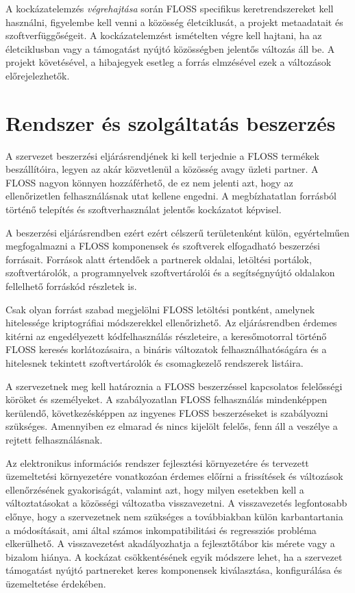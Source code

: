 \documentclass[12pt,magyar,a4paper,oneside]{scrreprt}
\begin{document}
A kockázatelemzés \emph{végrehajtása} során FLOSS specifikus
keretrendszereket kell használni, figyelembe kell venni a közösség
életciklusát, a projekt metaadatait és szoftverfüggőségeit. A
kockázatelemzést ismételten végre kell hajtani, ha az életciklusban vagy
a támogatást nyújtó közösségben jelentős változás áll be. A projekt
követésével, a hibajegyek esetleg a forrás elmzésével ezek a változások
előrejelezhetők.

\hypertarget{rendszer-uxe9s-szolguxe1ltatuxe1s-beszerzuxe9s}{%
\section{Rendszer és szolgáltatás
beszerzés}\label{rendszer-uxe9s-szolguxe1ltatuxe1s-beszerzuxe9s}}

A szervezet beszerzési eljárásrendjének ki kell terjednie a FLOSS
termékek beszállítóira, legyen az akár közvetlenül a közösség avagy
üzleti partner. A FLOSS nagyon könnyen hozzáférhető, de ez nem jelenti
azt, hogy az ellenőrizetlen felhasználásnak utat kellene engedni. A
megbízhatatlan forrásból történő telepítés és szoftverhasználat jelentős
kockázatot képvisel.

A beszerzési eljárásrendben ezért ezért célszerű területenként külön,
egyértelműen megfogalmazni a FLOSS komponensek és szoftverek elfogadható
beszerzési forrásait. Források alatt értendőek a partnerek oldalai,
letöltési portálok, szoftvertárolók, a programnyelvek szoftvertárolói és
a segítségnyújtó oldalakon fellelhető forráskód részletek is.

Csak olyan forrást szabad megjelölni FLOSS letöltési pontként, amelynek
hitelessége kriptográfiai módszerekkel ellenőrizhető. Az eljárásrendben
érdemes kitérni az engedélyezett kódfelhasználás részleteire, a
keresőmotorral történő FLOSS keresés korlátozásaira, a bináris
változatok felhasználhatóságára és a hitelesnek tekintett
szoftvertárolók és csomagkezelő rendszerek listáira.

A szervezetnek meg kell határoznia a FLOSS beszerzéssel kapcsolatos
felelősségi köröket és személyeket. A szabályozatlan FLOSS felhasználás
mindenképpen kerülendő, következésképpen az ingyenes FLOSS beszerzéseket
is szabályozni szükséges. Amennyiben ez elmarad és nincs kijelölt
felelős, fenn áll a veszélye a rejtett felhasználásnak.

Az elektronikus információs rendszer fejlesztési környezetére és
tervezett üzemeltetési környezetére vonatkozóan érdemes előírni a
frissítések és változások ellenőrzésének gyakoriságát, valamint azt,
hogy milyen esetekben kell a változtatásokat a közösségi változatba
visszavezetni. A visszavezetés legfontosabb előnye, hogy a szervezetnek
nem szükséges a továbbiakban külön karbantartania a módosításait, ami
által számos inkompatibilitási és regressziós probléma elkerülhető. A
visszavezetést akadályozhatja a fejlesztőtábor kis mérete vagy a bizalom
hiánya. A kockázat csökkentésének egyik módszere lehet, ha a szervezet
támogatást nyújtó partnereket keres komponensek kiválasztása,
konfigurálása és üzemeltetése érdekében.
\end{document}
